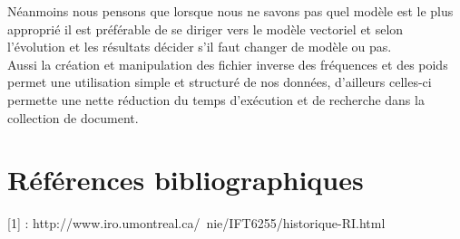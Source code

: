 \documentclass[12pt,a4paper,oneside]{article}
\begin{document}
Néanmoins nous pensons que lorsque nous ne savons pas quel modèle est le plus approprié il est préférable de se diriger vers le modèle vectoriel et selon l'évolution et les résultats décider s'il faut changer de modèle ou pas.\\

Aussi la création et manipulation des fichier inverse des fréquences et des poids permet une utilisation simple et structuré de nos données, d'ailleurs celles-ci permette une nette réduction du temps d'exécution et de recherche dans la collection de document.

\newpage

\section*{Références bibliographiques}

[1] : http://www.iro.umontreal.ca/~nie/IFT6255/historique-RI.html
\end{document}
